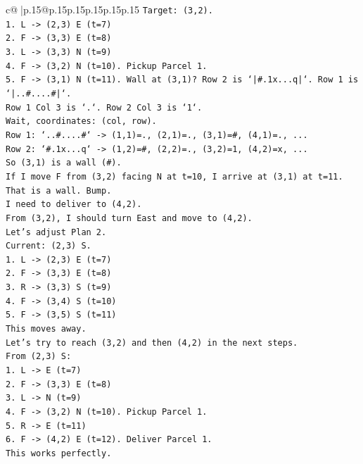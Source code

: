 \documentclass{article}
\begin{document}
{\begin{supertabular}{c@{$\;$}|p{.15\linewidth}@{}p{.15\linewidth}p{.15\linewidth}p{.15\linewidth}p{.15\linewidth}p{.15\linewidth}}
{{{\texttt{Target: (3,2).} \\
\texttt{1. L {-}> (2,3) E (t=7)} \\
\texttt{2. F {-}> (3,3) E (t=8)} \\
\texttt{3. L {-}> (3,3) N (t=9)} \\
\texttt{4. F {-}> (3,2) N (t=10). Pickup Parcel 1.} \\
\texttt{5. F {-}> (3,1) N (t=11). Wall at (3,1)? Row 2 is `|\#.1x...q|`. Row 1 is `|..\#....\#|`.} \\
\texttt{Row 1 Col 3 is `.`. Row 2 Col 3 is `1`.} \\
\texttt{Wait, coordinates: (col, row).} \\
\texttt{Row 1: `..\#....\#` {-}> (1,1)=., (2,1)=., (3,1)=\#, (4,1)=., ...} \\
\texttt{Row 2: `\#.1x...q` {-}> (1,2)=\#, (2,2)=., (3,2)=1, (4,2)=x, ...} \\
\texttt{So (3,1) is a wall (\#).} \\
\texttt{If I move F from (3,2) facing N at t=10, I arrive at (3,1) at t=11. That is a wall. Bump.} \\
\texttt{I need to deliver to (4,2).} \\
\texttt{From (3,2), I should turn East and move to (4,2).} \\
\texttt{Let's adjust Plan 2.} \\
\texttt{Current: (2,3) S.} \\
\texttt{1. L {-}> (2,3) E (t=7)} \\
\texttt{2. F {-}> (3,3) E (t=8)} \\
\texttt{3. R {-}> (3,3) S (t=9)} \\
\texttt{4. F {-}> (3,4) S (t=10)} \\
\texttt{5. F {-}> (3,5) S (t=11)} \\
\texttt{This moves away.} \\
\texttt{Let's try to reach (3,2) and then (4,2) in the next steps.} \\
\texttt{From (2,3) S:} \\
\texttt{1. L {-}> E (t=7)} \\
\texttt{2. F {-}> (3,3) E (t=8)} \\
\texttt{3. L {-}> N (t=9)} \\
\texttt{4. F {-}> (3,2) N (t=10). Pickup Parcel 1.} \\
\texttt{5. R {-}> E (t=11)} \\
\texttt{6. F {-}> (4,2) E (t=12). Deliver Parcel 1.} \\
\texttt{This works perfectly.} \\
}}}
\end{supertabular}}
\end{document}
